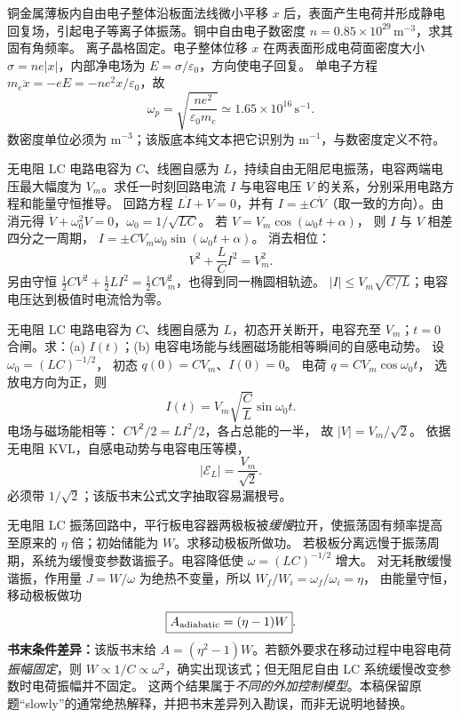 铜金属薄板内自由电子整体沿板面法线微小平移 $x$ 后，表面产生电荷并形成静电回复场，引起电子等离子体振荡。铜中自由电子数密度 $n=0.85\times10^{29}\,\mathrm{m^{-3}}$，求其固有角频率。
\exsolution
离子晶格固定。电子整体位移 $x$ 在两表面形成电荷面密度大小 $\sigma=ne|x|$，内部净电场为 $E=\sigma/\varepsilon_0$，方向使电子回复。
单电子方程
$m_e\ddot x=-eE=-ne^2x/\varepsilon_0$，故
\[
\boxed{\omega_p=\sqrt{\frac{ne^2}{\varepsilon_0m_e}}
\simeq1.65\times10^{16}\,\mathrm{s^{-1}}}.
\]
\excheck 数密度单位必须为 $\mathrm{m^{-3}}$；该版底本纯文本把它识别为 $\mathrm{m^{-1}}$，与数密度定义不符。

无电阻 LC 电路电容为 $C$、线圈自感为 $L$，持续自由无阻尼电振荡，电容两端电压最大幅度为 $V_m$。求任一时刻回路电流 $I$ 与电容电压 $V$ 的关系，分别采用电路方程和能量守恒推导。
\exsolution
回路方程 $L\dot I+V=0$，并有 $I=\pm C\dot V$（取一致的方向）。由消元得
$\ddot V+\omega_0^2V=0$，$\omega_0=1/\sqrt{LC}$。
若 $V=V_m\cos(\omega_0t+\alpha)$，
则 $I$ 与 $V$ 相差四分之一周期，
$I=\pm CV_m\omega_0\sin(\omega_0t+\alpha)$。
消去相位：
\[
\boxed{V^2+\frac LC I^2=V_m^2}.
\]
另由守恒
$\tfrac12CV^2+\tfrac12LI^2=\tfrac12CV_m^2$，也得到同一椭圆相轨迹。
\excheck $|I|\le V_m\sqrt{C/L}$；电容电压达到极值时电流恰为零。

无电阻 LC 电路电容为 $C$、线圈自感为 $L$，初态开关断开，电容充至 $V_m$；$t=0$ 合闸。求：(a) $I(t)$；(b) 电容电场能与线圈磁场能相等瞬间的自感电动势。
\exsolution
设 $\omega_0=(LC)^{-1/2}$，
初态 $q(0)=CV_m$、$I(0)=0$。
电荷 $q=CV_m\cos\omega_0t$，
选放电方向为正，则
\[
\boxed{I(t)=V_m\sqrt{\frac CL}\sin\omega_0t}.
\]
电场与磁场能相等：
$CV^2/2=LI^2/2$，各占总能的一半，
故 $|V|=V_m/\sqrt2$。
依据无电阻 KVL，自感电动势与电容电压等模，
\[
\boxed{|\mathcal E_L|=\frac{V_m}{\sqrt2}}.
\]
\excheck 必须带 $1/\sqrt2$；该版书末公式文字抽取容易漏根号。

无电阻 LC 振荡回路中，平行板电容器两极板被\emph{缓慢}拉开，使振荡固有频率提高至原来的 $\eta$ 倍；初始储能为 $W$。求移动极板所做功。
\exsolution
若极板分离远慢于振荡周期，系统为缓慢变参数谐振子。电容降低使
$\omega=(LC)^{-1/2}$ 增大。
对无耗散缓慢谐振，作用量
$J=W/\omega$ 为绝热不变量，所以
$W_f/W_i=\omega_f/\omega_i=\eta$，
由能量守恒，移动极板做功
\[
\boxed{A_{\rm adiabatic}=(\eta-1)W}.
\]
\textbf{书末条件差异：}该版书末给
$A=(\eta^2-1)W$。若额外要求在移动过程中电容电荷\emph{振幅固定}，则
$W\propto1/C\propto\omega^2$，确实出现该式；但无阻尼自由 LC 系统缓慢改变参数时电荷振幅并不固定。
\excheck 这两个结果属于\emph{不同的外加控制模型}。本稿保留原题“slowly”的通常绝热解释，并把书末差异列入勘误，而非无说明地替换。

